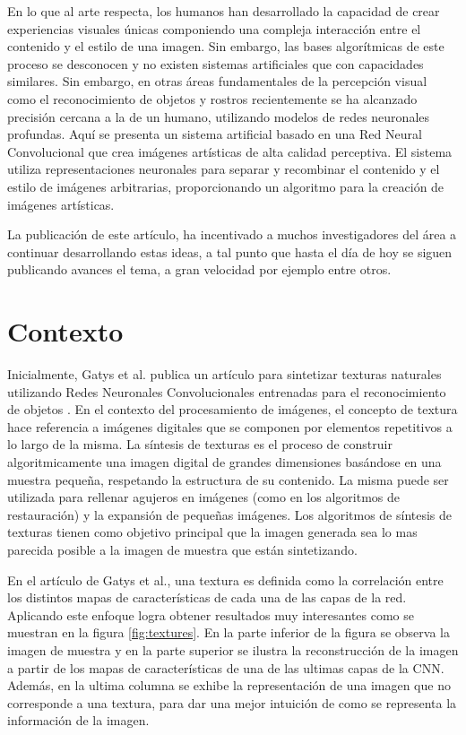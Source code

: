 \documentclass[a4paper,11pt,spanish]{book}
\begin{document}
      En lo que al arte respecta, los humanos han desarrollado la capacidad de crear experiencias visuales únicas componiendo una compleja interacción entre el contenido y el estilo de una imagen.
      Sin embargo, las bases algorítmicas de este proceso se desconocen y no existen sistemas artificiales que con capacidades similares. Sin embargo, en otras áreas fundamentales
      de la percepción visual como el reconocimiento de objetos y rostros recientemente se ha alcanzado precisión cercana a la de un humano, utilizando modelos de redes neuronales profundas.
      Aquí se presenta un sistema artificial basado en una Red Neural Convolucional que crea imágenes artísticas de alta calidad perceptiva. El sistema utiliza representaciones neuronales
      para separar y recombinar el contenido y el estilo de imágenes arbitrarias, proporcionando un algoritmo para la creación de imágenes artísticas.
      
      La publicación de este artículo, ha incentivado a muchos investigadores del área a continuar desarrollando estas ideas, a tal punto que hasta el día de hoy se siguen publicando
      avances el tema, a gran velocidad por ejemplo \cite{Johnson2016Perceptual, UlyanovVL16, luan2017deep} entre otros.


    \section{Contexto}
      Inicialmente, Gatys et al. publica un artículo para sintetizar texturas naturales utilizando Redes Neuronales Convolucionales entrenadas para el reconocimiento de 
      objetos \cite{Gatys:Texture_Synthesis}. 
      En el contexto del procesamiento de imágenes, el concepto de textura hace referencia a imágenes digitales que se componen por elementos repetitivos a lo largo de la 
      misma.
      La síntesis de texturas es el proceso de construir algoritmicamente una imagen digital de grandes dimensiones basándose en una muestra pequeña, respetando la 
      estructura de su contenido. 
      La misma puede ser utilizada para rellenar agujeros en imágenes (como en los algoritmos de restauración) y la expansión de pequeñas imágenes.
      Los algoritmos de síntesis de texturas tienen como objetivo principal que la imagen generada sea lo mas parecida posible a la imagen de muestra que están sintetizando.
     
      En el artículo de Gatys et al., una textura es definida como la correlación entre los distintos mapas de características de cada una de las capas de la red. Aplicando este enfoque
      logra obtener resultados muy interesantes como se muestran en la figura \ref{fig:textures}. En la parte inferior de la figura se observa la imagen de muestra y en la parte superior
      se ilustra la reconstrucción de la imagen a partir de los mapas de características de una de las ultimas capas de la CNN. Además, en la ultima columna se exhibe la representación
      de una imagen que no corresponde a una textura, para dar una mejor intuición de como se representa la información de la imagen.
\end{document}
